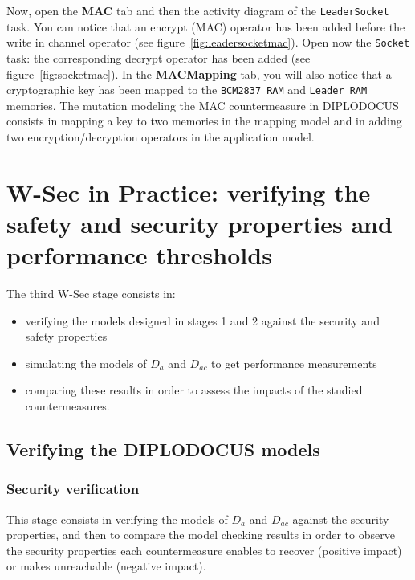 \documentclass{article}
\begin{document}
Now, open the \textbf{MAC} tab and then the activity diagram of the \texttt{LeaderSocket} task. You can notice that an encrypt (MAC) operator has been added before the write in channel operator (see figure~\ref{fig:leadersocketmac}). Open now the \texttt{Socket} task: the corresponding decrypt operator has been added (see figure~\ref{fig:socketmac}). In the \textbf{MACMapping} tab, you will also notice that a cryptographic key has been mapped to the \texttt{BCM2837\_RAM} and \texttt{Leader\_RAM} memories. The mutation modeling the MAC countermeasure in DIPLODOCUS consists in mapping a key to two memories in the mapping model and in adding two encryption/decryption operators in the application model.


\section{W-Sec in Practice: verifying the safety and security properties and performance thresholds}

The third W-Sec stage consists in:
\begin{itemize}
	\item verifying the models designed in stages 1 and 2 against the security and safety properties
	\item simulating the models of $D_a$ and $D_{a c}$ to get performance measurements
	\item comparing these results in order to assess the impacts of the studied countermeasures.
\end{itemize}

\subsection{Verifying the DIPLODOCUS models}

\subsubsection{Security verification}

This stage consists in verifying the models of $D_a$ and $D_{a c}$ against the security properties, and then to compare the model checking results in order to observe the security properties each countermeasure enables to recover (positive impact) or makes unreachable (negative impact).
\end{document}
